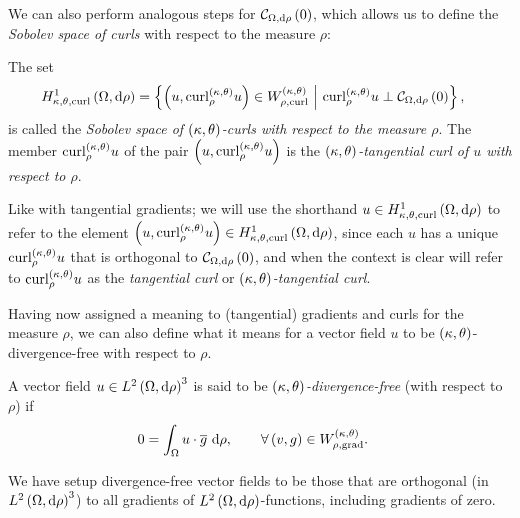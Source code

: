 We can also perform analogous steps for $\mathcal{C}_{ \Omega, \mathrm{d}\rho}\left( 0 \right)$, which allows us to define the \emph{Sobolev space of curls} with respect to the measure $\rho$:
\begin{definition} \label{def:CurlSobSpace}
	The set
	\begin{align*}
		H^1_{\kappa,\theta,\mathrm{curl}}\left( \Omega, \mathrm{d}\rho \right) &= \left\{  \left( u, \mathrm{curl}_{\rho}^{\left( \kappa, \theta \right)}u \right)\in W^{\left( \kappa, \theta \right)}_{\rho,\mathrm{curl}} \ \middle\vert \  \mathrm{curl}_{\rho}^{\left( \kappa, \theta \right)}u \perp \mathcal{C}_{ \Omega, \mathrm{d}\rho}\left( 0 \right)  \right\},
	\end{align*}
	is called the \emph{Sobolev space of $\left( \kappa, \theta \right)$-curls with respect to the measure $\rho$}.
	The member $\mathrm{curl}_{\rho}^{\left( \kappa, \theta \right)}u$ of the pair $\left( u, \mathrm{curl}_{\rho}^{\left( \kappa, \theta \right)}u \right)$ is the \emph{$\left( \kappa, \theta \right)$-tangential curl of $u$ with respect to $\rho$}.
\end{definition}
Like with tangential gradients; we will use the shorthand $u\in H^1_{\kappa,\theta,\mathrm{curl}}\left( \Omega, \mathrm{d}\rho \right)$ to refer to the element $\left( u, \mathrm{curl}_{\rho}^{\left( \kappa, \theta \right)}u \right)\in H^1_{\kappa,\theta,\mathrm{curl}}\left( \Omega, \mathrm{d}\rho \right)$, since each $u$ has a unique $\mathrm{curl}_{\rho}^{\left( \kappa, \theta \right)}u$ that is orthogonal to $\mathcal{C}_{ \Omega, \mathrm{d}\rho}\left( 0 \right)$, and when the context is clear will refer to $\mathrm{curl}_{\rho}^{\left( \kappa, \theta \right)}u$ as the \emph{tangential curl} or \emph{$\left( \kappa, \theta \right)$-tangential curl}.

Having now assigned a meaning to (tangential) gradients and curls for the measure $\rho$, we can also define what it means for a vector field $u$ to be $\left( \kappa, \theta \right)$-divergence-free with respect to $\rho$.
\begin{definition} \label{def:ktDivFree}
	A vector field $u\in L^{2}\left( \Omega,\mathrm{d}\rho \right)^3$ is said to be \emph{$\left( \kappa, \theta \right)$-divergence-free} (with respect to $\rho$) if
	\begin{align*}
		0 &= \int_{\Omega} u\cdot\overline{g}  \ \mathrm{d}\rho, \qquad\forall\left( v,g \right)\in W^{\left( \kappa, \theta \right)}_{\rho,\mathrm{grad}}.
	\end{align*}
\end{definition}
We have setup divergence-free vector fields to be those that are orthogonal (in $L^{2}\left( \Omega,\mathrm{d}\rho \right)^3$) to all gradients of $L^{2}\left( \Omega,\mathrm{d}\rho \right)$-functions, including gradients of zero.


